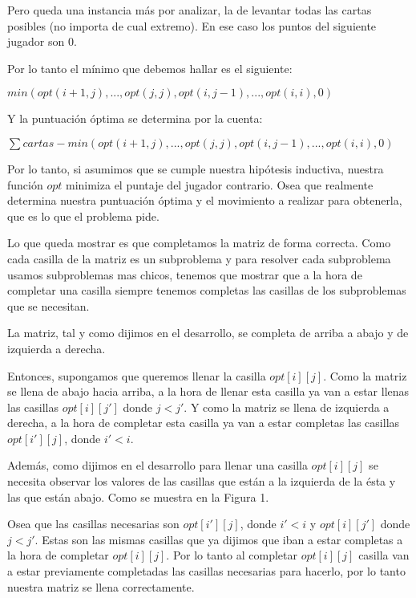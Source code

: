 Pero queda una instancia más por analizar, la de levantar todas las cartas posibles (no importa de cual extremo). En ese caso los puntos del siguiente jugador son 0.

Por lo tanto el mínimo que debemos hallar es el siguiente:

$min(opt(i+1,j), ... , opt(j,j), opt(i,j-1), ... , opt(i,i), 0)$

Y la puntuación óptima se determina por la cuenta:

$\sum cartas - min(opt(i+1,j), ... , opt(j,j), opt(i,j-1), ... , opt(i,i), 0)$

Por lo tanto, si asumimos que se cumple nuestra hipótesis inductiva, nuestra función $opt$ minimiza el puntaje del jugador contrario. Osea que realmente determina nuestra puntuación óptima y el movimiento a realizar para obtenerla, que es lo que el problema pide.

Lo que queda mostrar es que completamos la matriz de forma correcta. Como cada casilla de la matriz es un subproblema y para resolver cada subproblema usamos subproblemas mas chicos, tenemos que mostrar que a la hora de completar una casilla siempre tenemos completas las casillas de los subproblemas que se necesitan.

La matriz, tal y como dijimos en el desarrollo, se completa de arriba a abajo y de izquierda a derecha.

Entonces, supongamos que queremos llenar la casilla $opt[i][j]$. Como la matriz se llena de abajo hacia arriba, a la hora de llenar esta casilla ya van a estar llenas las casillas $opt[i][j']$ donde $j < j'$. Y como la matriz se llena de izquierda a derecha, a la hora de completar esta casilla ya van a estar completas las casillas $opt[i'][j]$, donde $i' < i$.

Además, como dijimos en el desarrollo para llenar una casilla $opt[i][j]$ se necesita observar los valores de las casillas que están a la izquierda de la ésta y las que están abajo. Como se muestra en la Figura 1.

Osea que las casillas necesarias son $opt[i'][j]$, donde $i' < i$ y $opt[i][j']$ donde $j < j'$. Estas son las mismas casillas que ya dijimos que iban a estar completas a la hora de completar $opt[i][j]$. Por lo tanto al completar $opt[i][j]$ casilla van a estar previamente completadas las casillas necesarias para hacerlo, por lo tanto nuestra matriz se llena correctamente.